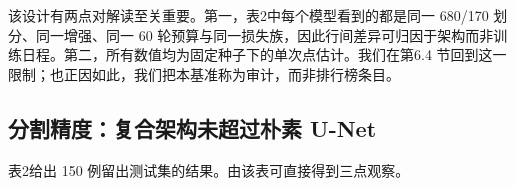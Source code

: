 \documentclass[conference]{IEEEtran}
\begin{document}
\begin{table}[t]
\centering

\caption{表1 本研究使用的数据划分。测试划分在训练前隔离；混合筛查队列仅由留出测试帧派生，并按排序序号交替拆分为互不相交的校准半与认证半。}
\label{tab:partitions}
\end{table}

该设计有两点对解读至关重要。第一，表2中每个模型看到的都是同一 680/170 划分、同一增强、同一 60 轮预算与同一损失族，因此行间差异可归因于架构而非训练日程。第二，所有数值均为固定种子下的单次点估计。我们在第6.4 节回到这一限制；也正因如此，我们把本基准称为审计，而非排行榜条目。

\subsection{分割精度：复合架构未超过朴素 U-Net}

表2给出 150 例留出测试集的结果。由该表可直接得到三点观察。
\end{document}
